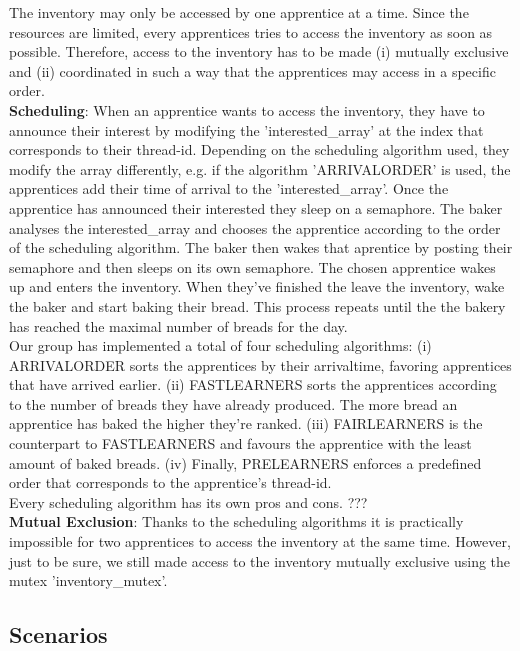 \documentclass[11pt]{article}
\begin{document}
The inventory may only be accessed by one apprentice at a time. Since the resources are limited, every apprentices tries to access the inventory as soon as possible. Therefore, access to the inventory has to be made (i) mutually exclusive and (ii) coordinated in such a way that the apprentices may access in a specific order.\\

\textbf{Scheduling}: When an apprentice wants to access the inventory, they have to announce their interest by modifying the 'interested\_array' at the index that corresponds to their thread-id. Depending on the scheduling algorithm used, they modify the array differently, e.g. if the algorithm 'ARRIVALORDER' is used, the apprentices add their time of arrival to the 'interested\_array'. Once the apprentice has announced their interested they sleep on a semaphore. The baker analyses the interested\_array and chooses the apprentice according to the order of the scheduling algorithm. The baker then wakes that aprentice by posting their semaphore and then sleeps on its own semaphore. The chosen apprentice wakes up and enters the inventory. When they've finished the leave the inventory, wake the baker and start baking their bread. This process repeats until the the bakery has reached the maximal number of breads for the day.\\

Our group has implemented a total of four scheduling algorithms: (i) ARRIVALORDER sorts the apprentices by their arrivaltime, favoring apprentices that have arrived earlier. (ii) FASTLEARNERS sorts the apprentices according to the number of breads they have already produced. The more bread an apprentice has baked the higher they're ranked. (iii) FAIRLEARNERS is the counterpart to FASTLEARNERS and favours the apprentice with the least amount of baked breads. (iv) Finally, PRELEARNERS enforces a predefined order that corresponds to the apprentice's thread-id.\\

Every scheduling algorithm has its own pros and cons. ???\\

\textbf{Mutual Exclusion}: Thanks to the scheduling algorithms it is practically impossible for two apprentices to access the inventory at the same time. However, just to be sure, we still made access to the inventory mutually exclusive using the mutex 'inventory\_mutex'.\\

\subsection{Scenarios}
\label{sec:org7325350}
\end{document}
